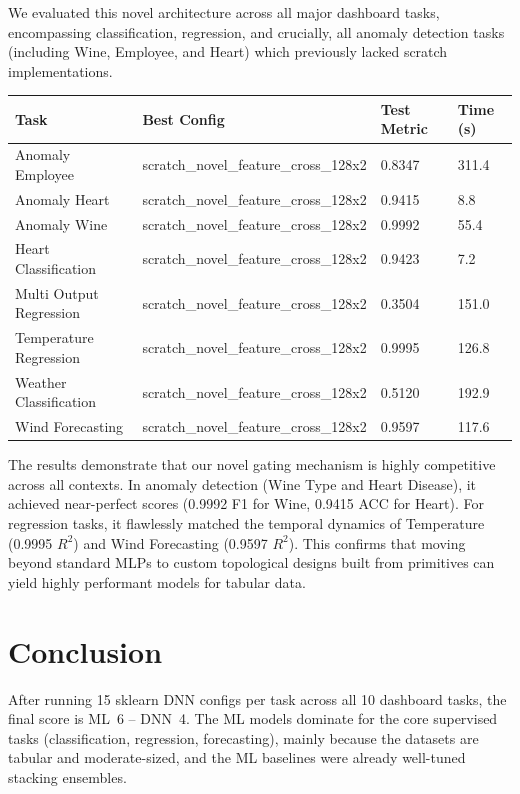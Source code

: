 \documentclass[11pt,a4paper]{article}
\begin{document}
We evaluated this novel architecture across all major dashboard tasks, encompassing classification, regression, and crucially, all anomaly detection tasks (including Wine, Employee, and Heart) which previously lacked scratch implementations.

\begin{center}
\small
\begin{tabular}{llll}
\toprule
Task & Best Config & Test Metric & Time (s) \\
\midrule
Anomaly Employee & scratch\_novel\_feature\_cross\_128x2 & 0.8347 & 311.4 \\
Anomaly Heart & scratch\_novel\_feature\_cross\_128x2 & 0.9415 & 8.8 \\
Anomaly Wine & scratch\_novel\_feature\_cross\_128x2 & 0.9992 & 55.4 \\
Heart Classification & scratch\_novel\_feature\_cross\_128x2 & 0.9423 & 7.2 \\
Multi Output Regression & scratch\_novel\_feature\_cross\_128x2 & 0.3504 & 151.0 \\
Temperature Regression & scratch\_novel\_feature\_cross\_128x2 & 0.9995 & 126.8 \\
Weather Classification & scratch\_novel\_feature\_cross\_128x2 & 0.5120 & 192.9 \\
Wind Forecasting & scratch\_novel\_feature\_cross\_128x2 & 0.9597 & 117.6 \\
\bottomrule
\end{tabular}
\normalsize
\end{center}

The results demonstrate that our novel gating mechanism is highly competitive across all contexts. In anomaly detection (Wine Type and Heart Disease), it achieved near-perfect scores (0.9992 F1 for Wine, 0.9415 ACC for Heart). For regression tasks, it flawlessly matched the temporal dynamics of Temperature (0.9995 $R^2$) and Wind Forecasting (0.9597 $R^2$). This confirms that moving beyond standard MLPs to custom topological designs built from primitives can yield highly performant models for tabular data.

\section{Conclusion}

After running 15 sklearn DNN configs per task across all 10 dashboard tasks, the final score is ML~6 -- DNN~4. The ML models dominate for the core supervised tasks (classification, regression, forecasting), mainly because the datasets are tabular and moderate-sized, and the ML baselines were already well-tuned stacking ensembles.
\end{document}
